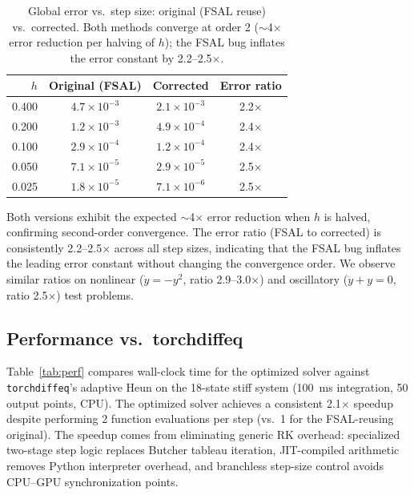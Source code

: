\documentclass[11pt]{article}
\begin{document}
\begin{table}[t]
\centering
\caption{Global error vs.\ step size: original (FSAL reuse) vs.\
corrected.  Both methods converge at order 2 ($\sim$4$\times$ error
reduction per halving of $h$); the FSAL bug inflates the error constant
by 2.2--2.5$\times$.}
\label{tab:order}
\small
\begin{tabular}{rccc}
\toprule
$h$ & Original (FSAL) & Corrected & Error ratio \\
\midrule
0.400 & $4.7 \times 10^{-3}$ & $2.1 \times 10^{-3}$ & 2.2$\times$ \\
0.200 & $1.2 \times 10^{-3}$ & $4.9 \times 10^{-4}$ & 2.4$\times$ \\
0.100 & $2.9 \times 10^{-4}$ & $1.2 \times 10^{-4}$ & 2.4$\times$ \\
0.050 & $7.1 \times 10^{-5}$ & $2.9 \times 10^{-5}$ & 2.5$\times$ \\
0.025 & $1.8 \times 10^{-5}$ & $7.1 \times 10^{-6}$ & 2.5$\times$ \\
\bottomrule
\end{tabular}
\end{table}

Both versions exhibit the expected $\sim$4$\times$ error reduction when
$h$ is halved, confirming second-order convergence.  The error ratio
(FSAL to corrected) is consistently 2.2--2.5$\times$ across all step
sizes, indicating that the FSAL bug inflates the leading error constant
without changing the convergence order.  We observe similar ratios on
nonlinear ($\dot{y} = -y^2$, ratio 2.9--3.0$\times$) and oscillatory
($\ddot{y} + y = 0$, ratio 2.5$\times$) test problems.

\subsection{Performance vs.\ torchdiffeq}

Table~\ref{tab:perf} compares wall-clock time for the optimized solver
against \texttt{torchdiffeq}'s adaptive Heun on the 18-state stiff
system (100~ms integration, 50 output points, CPU).  The optimized
solver achieves a consistent 2.1$\times$ speedup despite performing
2 function evaluations per step (vs.\ 1 for the FSAL-reusing original).
The speedup comes from eliminating generic RK overhead: specialized
two-stage step logic replaces Butcher tableau iteration, JIT-compiled
arithmetic removes Python interpreter overhead, and branchless step-size
control avoids CPU--GPU synchronization points.
\end{document}
